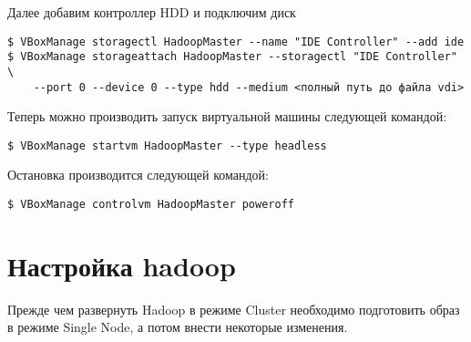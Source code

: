Далее добавим контроллер HDD и подключим диск
\begin{lstlisting}
$ VBoxManage storagectl HadoopMaster --name "IDE Controller" --add ide
$ VBoxManage storageattach HadoopMaster --storagectl "IDE Controller" \
    --port 0 --device 0 --type hdd --medium <полный путь до файла vdi>
\end{lstlisting}

Теперь можно производить запуск виртуальной машины следующей командой:
\begin{lstlisting}
$ VBoxManage startvm HadoopMaster --type headless
\end{lstlisting}
Остановка производится следующей командой:
\begin{lstlisting}
$ VBoxManage controlvm HadoopMaster poweroff
\end{lstlisting}

\section{Настройка hadoop}
Прежде чем развернуть Hadoop в режиме Cluster необходимо подготовить образ в режиме Single Node, а потом внести некоторые изменения.

